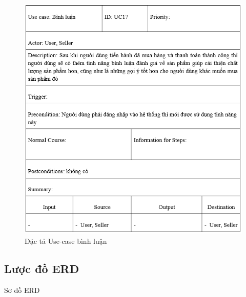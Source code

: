 \documentclass{article}
\begin{document}
{{{{{{{{{{{{{{{{{	\begin{center}
		\begin{figure}[htp]
			\begin{center}
				\includegraphics[scale=.930]{anh51.png}
			\end{center}
			\caption{Đặc tả Use-case bình luận}
			
		\end{figure}
	\end{center}
	
	\newpage
\subsection{Lược đồ ERD}
{\large Sơ đồ ERD

}}}}}}}}}}}}}}}}}}
\end{document}
